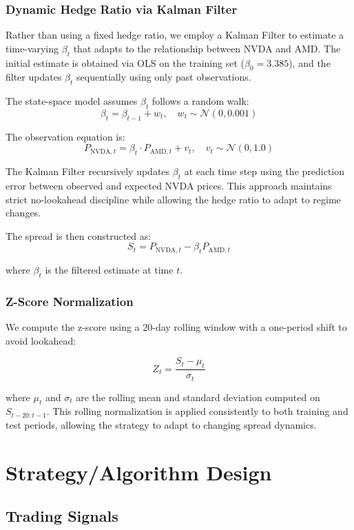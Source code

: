 \documentclass[11pt]{article}
\begin{document}
\subsubsection{Dynamic Hedge Ratio via Kalman Filter}

Rather than using a fixed hedge ratio, we employ a Kalman Filter to estimate a time-varying $\beta_t$ that adapts to the relationship between NVDA and AMD. The initial estimate is obtained via OLS on the training set ($\beta_0 = 3.385$), and the filter updates $\beta_t$ sequentially using only past observations.

The state-space model assumes $\beta_t$ follows a random walk:
\[
\beta_t = \beta_{t-1} + w_t, \quad w_t \sim \mathcal{N}(0, 0.001)
\]

The observation equation is:
\[
P_{\text{NVDA},t} = \beta_t \cdot P_{\text{AMD},t} + v_t, \quad v_t \sim \mathcal{N}(0, 1.0)
\]

The Kalman Filter recursively updates $\beta_t$ at each time step using the prediction error between observed and expected NVDA prices. This approach maintains strict no-lookahead discipline while allowing the hedge ratio to adapt to regime changes.

The spread is then constructed as:
\[
S_t = P_{\text{NVDA},t} - \beta_t P_{\text{AMD},t}
\]

where $\beta_t$ is the filtered estimate at time $t$.

\subsubsection{Z-Score Normalization}

We compute the z-score using a 20-day rolling window with a one-period shift to avoid lookahead:

\[
Z_t = \frac{S_t - \mu_t}{\sigma_t}
\]

where $\mu_t$ and $\sigma_t$ are the rolling mean and standard deviation computed on $S_{t-20:t-1}$. This rolling normalization is applied consistently to both training and test periods, allowing the strategy to adapt to changing spread dynamics.

\section{Strategy/Algorithm Design}

\subsection{Trading Signals}
\end{document}
